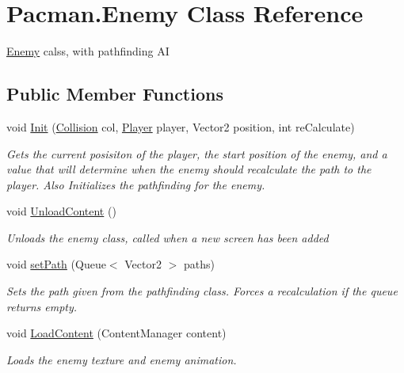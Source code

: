 \hypertarget{class_pacman_1_1_enemy}{\section{Pacman.\-Enemy Class Reference}
\label{class_pacman_1_1_enemy}
}


\hyperlink{class_pacman_1_1_enemy}{Enemy} calss, with pathfinding A\-I  


\subsection*{Public Member Functions}
\begin{DoxyCompactItemize}
\item 
void \hyperlink{class_pacman_1_1_enemy_a2a2ec352b4ead599d21f2e6cc14286a4}{Init} (\hyperlink{class_pacman_1_1_collision}{Collision} col, \hyperlink{class_pacman_1_1_player}{Player} player, Vector2 position, int re\-Calculate)
\begin{DoxyCompactList}\small\item\em Gets the current posisiton of the player, the start position of the enemy, and a value that will determine when the enemy should recalculate the path to the player. Also Initializes the pathfinding for the enemy. \end{DoxyCompactList}\item 
void \hyperlink{class_pacman_1_1_enemy_a0e536519c29079058f97a1e61140dd40}{Unload\-Content} ()
\begin{DoxyCompactList}\small\item\em Unloads the enemy class, called when a new screen has been added \end{DoxyCompactList}\item 
void \hyperlink{class_pacman_1_1_enemy_adba93972a25a4b42270e73903701e394}{set\-Path} (Queue$<$ Vector2 $>$ paths)
\begin{DoxyCompactList}\small\item\em Sets the path given from the pathfinding class. Forces a recalculation if the queue returns empty. \end{DoxyCompactList}\item 
void \hyperlink{class_pacman_1_1_enemy_a48f4d1d34ca4de8480f5b2a27aa7eb4e}{Load\-Content} (Content\-Manager content)
\begin{DoxyCompactList}\small\item\em Loads the enemy texture and enemy animation. \end{DoxyCompactList}\item 

\end{DoxyCompactItemize}
